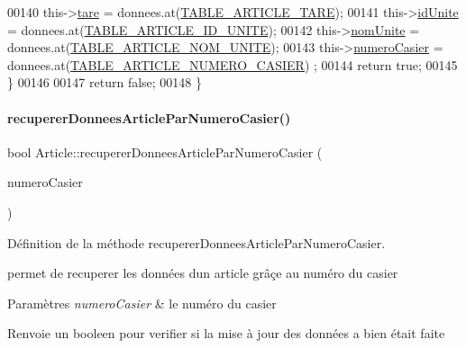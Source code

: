 \begin{DoxyCode}
00140         this->\hyperlink{class_article_abacf2d29d4b2e3e7b49256bc48d5fe64}{tare} = donnees.at(\hyperlink{_article_8h_a159354683cfd6e1b578172fbe6490ab6a970d883b74adb323da887e30bef922f5}{TABLE\_ARTICLE\_TARE});
00141         this->\hyperlink{class_article_a702cff16cb9cd0774383ceba81d83869}{idUnite} = donnees.at(\hyperlink{_article_8h_a159354683cfd6e1b578172fbe6490ab6aa27f54cec32c08b45beaf39f1259ae92}{TABLE\_ARTICLE\_ID\_UNITE});
00142         this->\hyperlink{class_article_a43a20e248e57150af0546c9f4b6b74c3}{nomUnite} = donnees.at(\hyperlink{_article_8h_a159354683cfd6e1b578172fbe6490ab6abc2184dab6c03e59872ced7183608174}{TABLE\_ARTICLE\_NOM\_UNITE});
00143         this->\hyperlink{class_article_a4b8dd9598cc16200c60c7f55196fc26d}{numeroCasier} = donnees.at(\hyperlink{_article_8h_a159354683cfd6e1b578172fbe6490ab6a43ae9bea39dd3f12e8732bcd2d7c0223}{TABLE\_ARTICLE\_NUMERO\_CASIER})
      ;
00144         \textcolor{keywordflow}{return} \textcolor{keyword}{true};
00145     \}
00146 
00147     \textcolor{keywordflow}{return} \textcolor{keyword}{false};
00148 \}
\end{DoxyCode}
\mbox{\label{class_article_a5d8241c703f142bbc8b011f867fd953f}} 
\paragraph{\texorpdfstring{recuperer\+Donnees\+Article\+Par\+Numero\+Casier()}{recupererDonneesArticleParNumeroCasier()}}
{\footnotesize\ttfamily bool Article\+::recuperer\+Donnees\+Article\+Par\+Numero\+Casier (\begin{DoxyParamCaption}\item[{Q\+String}]{numero\+Casier }\end{DoxyParamCaption})}



Définition de la méthode recuperer\+Donnees\+Article\+Par\+Numero\+Casier. 

permet de recuperer les données d\textquotesingle{}un article grâçe au numéro du casier 
\begin{DoxyParams}{Paramètres}
{\em numero\+Casier} & le numéro du casier \\
\hline
\end{DoxyParams}
\begin{DoxyReturn}{Renvoie}
un booleen pour verifier si la mise à jour des données a bien était faite 
\end{DoxyReturn}


